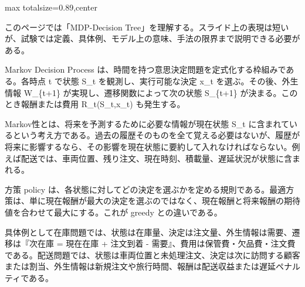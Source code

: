 \begin{minipage}[t]{0.58\textwidth}
\begin{adjustbox}{max totalsize={\textwidth}{0.89\textheight},center}
\begin{minipage}{\textwidth}\scriptsize
{}このページでは「MDP-Decision Tree」を理解する。スライド上の表現は短いが、試験では定義、具体例、モデル上の意味、手法の限界まで説明できる必要がある。\par
Markov Decision Process は、時間を持つ意思決定問題を定式化する枠組みである。各時点 t で状態 S\_t を観測し、実行可能な決定 x\_t を選ぶ。その後、外生情報 W\_\{t+1\} が実現し、遷移関数によって次の状態 S\_\{t+1\} が決まる。このとき報酬または費用 R\_t(S\_t,x\_t) も発生する。\par
Markov性とは、将来を予測するために必要な情報が現在状態 S\_t に含まれているという考え方である。過去の履歴そのものを全て覚える必要はないが、履歴が将来に影響するなら、その影響を現在状態に要約して入れなければならない。例えば配送では、車両位置、残り注文、現在時刻、積載量、遅延状況が状態に含まれる。\par
方策 policy は、各状態に対してどの決定を選ぶかを定める規則である。最適方策は、単に現在報酬が最大の決定を選ぶのではなく、現在報酬と将来報酬の期待値を合わせて最大にする。これが greedy との違いである。\par
具体例として在庫問題では、状態は在庫量、決定は注文量、外生情報は需要、遷移は『次在庫 = 現在在庫 + 注文到着 - 需要』、費用は保管費・欠品費・注文費である。配送問題では、状態は車両位置と未処理注文、決定は次に訪問する顧客または割当、外生情報は新規注文や旅行時間、報酬は配送収益または遅延ペナルティである。\par

\end{minipage}
\end{adjustbox}
\end{minipage}
